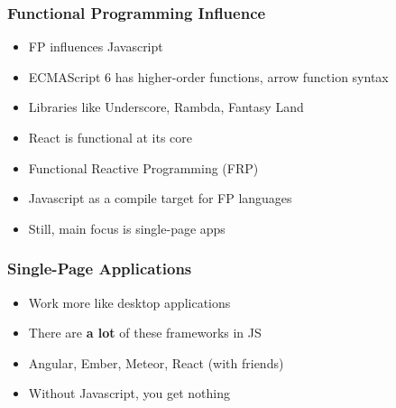 \begin{frame}
  \frametitle{Functional Programming Influence}
  \begin{itemize}
    \pause
    \item<+-> FP influences Javascript
    \item<+-> ECMAScript 6 has higher-order functions, arrow function syntax
    \item<+-> Libraries like Underscore, Rambda, Fantasy Land
    \item<+-> React is functional at its core
    \item<+-> Functional Reactive Programming (FRP)
    \item<+-> Javascript as a compile target for FP languages
    \item<+-> Still, main focus is single-page apps
  \end{itemize}
\end{frame}

\begin{frame}
  \frametitle{Single-Page Applications}
  \begin{itemize}
    \pause
    \item<+-> Work more like desktop applications
    \item<+-> There are \textbf{a lot} of these frameworks in JS
    \item<+-> Angular, Ember, Meteor, React (with friends)
    \item<+-> Without Javascript, you get nothing
  \end{itemize}
\end{frame}

